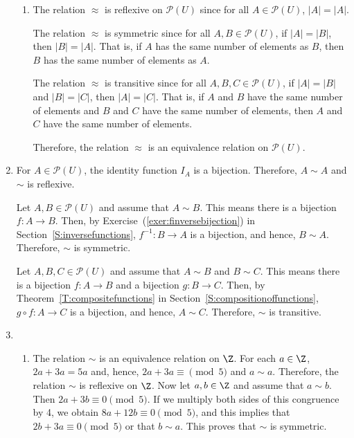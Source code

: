\begin{enumerate}
\begin{enumerate}
\item The relation  $ \approx $  is reflexive on  $\mathcal{P}\left( U \right)$  since for all  
$A \in \mathcal{P}\left( U \right)$,  $\left| A \right| = \left| A \right|$.

The relation  $ \approx $ is symmetric since  for all  $A, B \in \mathcal{P}\left( U \right)$, if  $\left| A \right| = \left| B \right|$, then  $\left| B \right| = \left| A \right|$.  That is, if  $A$  has the same number of elements as  $B$, then  $B$  has the same number of elements as  $A$.

The relation  $ \approx $ is transitive since  for all  $A, B, C \in \mathcal{P}\left( U \right)$, if  $\left| A \right| = \left| B \right|$ and  $\left| B \right| = \left| C \right|$, then  $\left| A \right| = \left| C \right|.$  That is,  if  $A$  and  $B$  have the same number of elements and  $B$  and  $C$  have the same number of elements, then  $A$  and  $C$  have the same number of elements.

Therefore, the relation $\approx$ is an equivalence relation on $\mathcal{P}\left( U \right)$.
\end{enumerate}




\item For $A \in \mathcal{P} \left( U \right)$, the identity function $I_A$ is a bijection.  Therefore, $A \sim A$ and $\sim$ is reflexive.

Let $A, B \in \mathcal{P} \left( U \right)$ and assume that $A \sim B$.  This means there is a bijection $f: A \to B$.  Then, by Exercise~(\ref{exer:finversebijection}) in 
Section~\ref{S:inversefunctions}, $f^{-1}:B \to A$ is a bijection, and hence, $B \sim A$.  Therefore, $\sim$ is symmetric.

Let $A, B, C \in \mathcal{P} \left( U \right)$ and assume that $A \sim B$ and $B \sim C$.  This means there is a bijection $f: A \to B$ and a bijection $g:B \to C$.  Then, by 
Theorem~\ref{T:compositefunctions} in Section~\ref{S:compositionoffunctions}, 
$g \circ f: A \to C$ is a bijection, and hence, $A \sim C$.  Therefore, $\sim$ is transitive.



\item \begin{enumerate}
\item The relation $\sim$ is an equivalence relation on $\Z$.  For each $a \in \Z$, 
$2a + 3a = 5a$ and, hence, $2a + 3a \equiv \pmod 5$ and $a \sim a$.  Therefore, the relation 
$\sim$ is reflexive on $\Z$.  Now let $a, b \in \Z$ and assume that $a \sim b$.  Then 
$2a + 3b \equiv 0 \pmod 5$.  If we multiply both sides of this congruence by 4, we obtain 
$8a + 12b \equiv 0 \pmod 5$, and this implies that $2b + 3a \equiv 0 \pmod 5$ or that 
$b \sim a$.  This proves that $\sim$ is symmetric.


\end{enumerate}
\end{enumerate}
